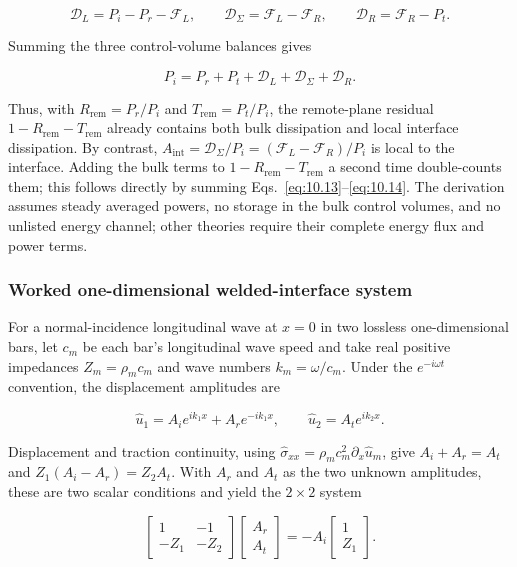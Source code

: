 \begin{equation}
\mathcal{D}_L=P_i-P_r-\mathcal{F}_L,\qquad
\mathcal{D}_{\Sigma}=\mathcal{F}_L-\mathcal{F}_R,\qquad
\mathcal{D}_R=\mathcal{F}_R-P_t.
\label{eq:10.13}
\end{equation}

Summing the three control-volume balances gives

\begin{equation}
P_i=P_r+P_t+\mathcal{D}_L+\mathcal{D}_{\Sigma}+\mathcal{D}_R.
\label{eq:10.14}
\end{equation}

Thus, with $R_{\mathrm{rem}}=P_r/P_i$ and $T_{\mathrm{rem}}=P_t/P_i$, the remote-plane residual $1-R_{\mathrm{rem}}-T_{\mathrm{rem}}$ already contains both bulk dissipation and local interface dissipation. By contrast, $A_{\mathrm{int}}=\mathcal{D}_{\Sigma}/P_i=(\mathcal{F}_L-\mathcal{F}_R)/P_i$ is local to the interface. Adding the bulk terms to $1-R_{\mathrm{rem}}-T_{\mathrm{rem}}$ a second time double-counts them; this follows directly by summing Eqs.~\eqref{eq:10.13}--\eqref{eq:10.14}. The derivation assumes steady averaged powers, no storage in the bulk control volumes, and no unlisted energy channel; other theories require their complete energy flux and power terms.

\subsubsection{Worked one-dimensional welded-interface system}

For a normal-incidence longitudinal wave at $x=0$ in two lossless one-dimensional bars, let $c_m$ be each bar's longitudinal wave speed and take real positive impedances $Z_m=\rho_m c_m$ and wave numbers $k_m=\omega/c_m$. Under the $e^{-i\omega t}$ convention, the displacement amplitudes are

\begin{equation}
\hat u_1=A_i e^{ik_1x}+A_r e^{-ik_1x},\qquad
\hat u_2=A_t e^{ik_2x}.
\label{eq:10.15}
\end{equation}

Displacement and traction continuity, using $\hat\sigma_{xx}=\rho_m c_m^2\partial_x\hat u_m$, give $A_i+A_r=A_t$ and $Z_1(A_i-A_r)=Z_2A_t$. With $A_r$ and $A_t$ as the two unknown amplitudes, these are two scalar conditions and yield the $2\times2$ system

\begin{equation}
\begin{bmatrix}1&-1\\-Z_1&-Z_2\end{bmatrix}
\begin{bmatrix}A_r\\A_t\end{bmatrix}
=-A_i\begin{bmatrix}1\\Z_1\end{bmatrix}.
\label{eq:10.16}
\end{equation}

